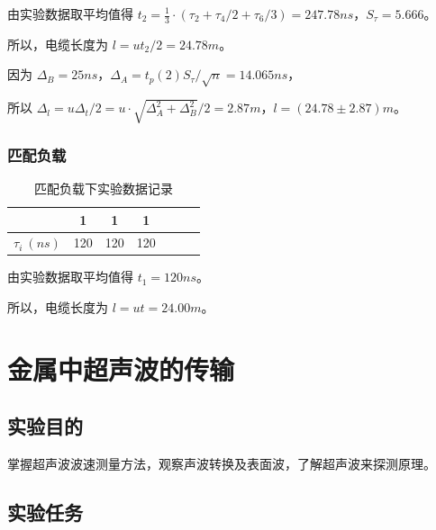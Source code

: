 \documentclass[a4paper]{article}
\begin{document}
            \par 由实验数据取平均值得 $t_2=\frac{1}{3}\cdot(\tau_2+\tau_4/2+\tau_6/3)=247.78ns$，$S_{\tau}=5.666$。

            \par 所以，电缆长度为 $l=ut_2/2=24.78m$。

            \par 因为 $\Delta_B=25ns$，$\Delta_A=t_p(2)S_{\tau}/\sqrt{n}=14.065ns$，

            \par 所以 $\Delta_l=u\Delta_t/2=u\cdot\sqrt{\Delta^2_A+\Delta^2_B}/2=2.87m$，$l=(24.78\pm2.87)m$。

        \subsubsection{匹配负载}

            \begin{table}[H]
                \centering
                \begin{tabular}{|c|c|c|c|c|c|c|}
                    \hline
                                    & 1         & 1         & 1         \\ \hline
                    $\tau_i\ (ns)$  & 120       & 120       & 120       \\ \hline
                \end{tabular}
                \caption{匹配负载下实验数据记录}
            \end{table}

            \par 由实验数据取平均值得 $t_1=120ns$。

            \par 所以，电缆长度为 $l=ut=24.00m$。
        
\section{金属中超声波的传输}
    
    \subsection{实验目的}

        \par 掌握超声波波速测量方法，观察声波转换及表面波，了解超声波来探测原理。
    
    \subsection{实验任务}
\end{document}
